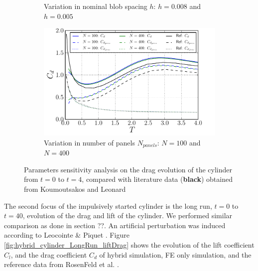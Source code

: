 \begin{figure}[!p]
\begin{subfigure}[t]{0.49\textwidth}
             \caption{Variation in nominal blob spacing $h$: $h=0.008$ and $h=0.005$}
             \label{fig:hybrid_ISC_drag_nBlobComparison}
     \end{subfigure}
     
     \begin{subfigure}[b]{0.49\textwidth}
             \includegraphics[width=\textwidth]{./figures/hybrid/isc/hybrid_ISC_drag_nPanelComparison.pdf}
             \caption{Variation in number of panels $N_{panels}$: $N=100$ and $N=400$}
             \label{fig:hybrid_ISC_drag_nPanelComparison}
	 \end{subfigure}
    
     \caption{Parameters sensitivity analysis on the drag evolution of the cylinder from $t=0$ to $t=4$, compared with literature data (\textbf{black}) obtained from Koumoutsakos and Leonard \cite{Koumoutsakos1995a}}
     \label{fig:hybrid_ISC_parameterSensitivity}
	\end{figure}

The second focus of the impulsively started cylinder is the long run, $t=0$ to $t=40$, evolution of the drag and lift of the cylinder. We performed similar comparison as done in section ??. An artificial perturbation was induced according to Leocointe \& Piquet \cite{Lecointe1984}. Figure \ref{fig:hybrid_cylinder_LongRun_liftDrag} shows the evolution of the lift coefficient $C_l$, and the drag coefficient $C_d$ of hybrid simulation, FE only simulation, and the reference data from RosenFeld et al. \cite{MosheRosenFeldDochanKwak1991}. 

